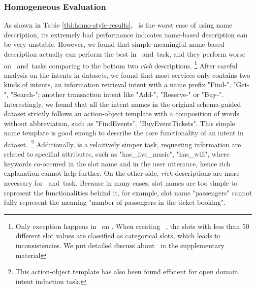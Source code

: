 \subsubsection{Homogeneous Evaluation}
\label{sssec:homo-eval}
 As shown in Table
\ref{tbl:homo-style-results}, \ID~is the worst case of using name
description, its extremely bad performance indicates name-based
description can be very unstable. However, we found that simple
meaningful name-based description actually can perform the best in
\IC~and~\RSI task, and they perform worse on \CSL~and~\NSL tasks
comparing to the bottom two {\it rich} descriptions. \footnote{Only
  exception happens in \CSL~on \multiwoz. When creating
  \multiwoz~\cite{zang-etal-2020-multiwoz}, the slots with less than
  50 different slot values are classified as categorical slots, which
  leads to inconsistencies. We put detailed discuss about \multiwoz~in
  the supplementary material} After careful analysis on the intents in
\sgdst datasets, we found that most services only contains two kinds
of intents, an information retrieval intent with a name prefix
"Find-", "Get-", "Search-"; another transaction intent like "Add-",
"Reserve-" or "Buy-". Interestingly, we found that all the intent
names in the original schema-guided dataset strictly follows an
action-object template with a composition of words without
abbreviation, such as "FindEvents", "BuyEventTickets". This simple
name template is good enough to describe the core functionality of an
intent in \sgdst dataset.~\footnote{This action-object template has
  also been found efficient for open domain intent induction
  task\cite[e.g.,][OPINE]{vedula2020open}.} Additionally, \RSI is a
relaitively simper task, requesting information are related to
specifial attributes, such as "has\_live\_music", "has\_wifi", where
keywords co-occured in the slot name and in the user utterance, hence
rich explanation cannot help further. On the other side, {\it rich}
descriptions are more necessary for \CSL~and~\NSL task. Because in
many cases, slot names are too simple to represent the functionalities
behind it, for example, slot name "passengers" cannot fully represent
the meaning "number of passengers in the ticket booking".

